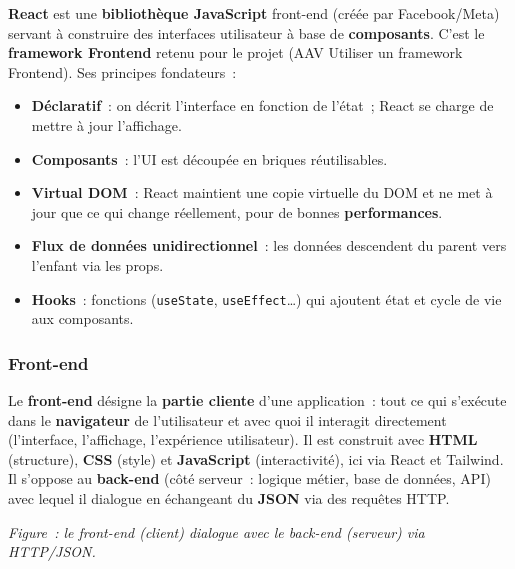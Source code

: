 \noindent \textbf{React} est une \textbf{bibliothèque JavaScript} front-end (créée par Facebook/Meta) servant à construire des interfaces utilisateur à base de \textbf{composants}. C'est le \textbf{framework Frontend} retenu pour le projet (AAV \og{}Utiliser un framework Frontend\fg{}). Ses principes fondateurs~:
\begin{itemize}
	\item \textbf{Déclaratif}~: on décrit l'interface en fonction de l'état~; React se charge de mettre à jour l'affichage.
	\item \textbf{Composants}~: l'UI est découpée en briques réutilisables.
	\item \textbf{Virtual DOM}~: React maintient une copie virtuelle du DOM et ne met à jour que ce qui change réellement, pour de bonnes \textbf{performances}.
	\item \textbf{Flux de données unidirectionnel}~: les données descendent du parent vers l'enfant via les props.
	\item \textbf{Hooks}~: fonctions (\texttt{useState}, \texttt{useEffect}…) qui ajoutent état et cycle de vie aux composants.
\end{itemize}

\subsubsection*{Front-end}
{}

\noindent Le \textbf{front-end} désigne la \textbf{partie cliente} d'une application~: tout ce qui s'exécute dans le \textbf{navigateur} de l'utilisateur et avec quoi il interagit directement (l'interface, l'affichage, l'expérience utilisateur). Il est construit avec \textbf{HTML} (structure), \textbf{CSS} (style) et \textbf{JavaScript} (interactivité), ici via React et Tailwind. Il s'oppose au \textbf{back-end} (côté serveur~: logique métier, base de données, API) avec lequel il dialogue en échangeant du \textbf{JSON} via des requêtes HTTP.
\begin{center}
\end{center}
\noindent\textit{Figure~: le front-end (client) dialogue avec le back-end (serveur) via HTTP/JSON.}

